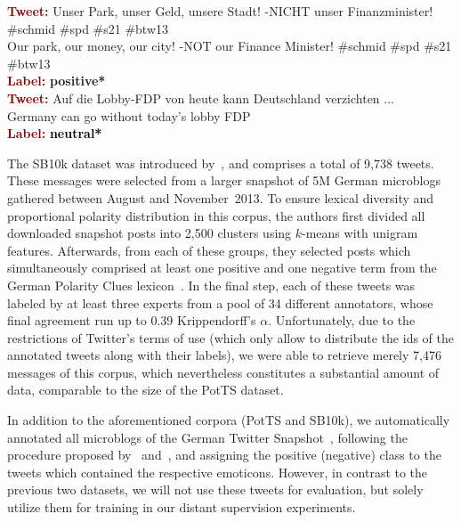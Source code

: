 \begin{example}\label{snt:cgsa:exmp:anno2}
  \noindent\textup{\bfseries\textcolor{darkred}{Tweet:}} {\upshape Unser Park, unser Geld, unsere Stadt! -NICHT unser Finanzminister! \smiley{} \#schmid \#spd \#s21 \#btw13}\\
  \noindent Our park, our money, our city! -NOT our Finance Minister! \smiley{} \#schmid \#spd \#s21 \#btw13\\
  \noindent\textup{\bfseries\textcolor{darkred}{Label:}}\hspace*{2em}\textbf{%
    \upshape\textcolor{green3}{positive*}}\\[1.5em]
  \noindent\textup{\bfseries\textcolor{darkred}{Tweet:}} {\upshape Auf die Lobby-FDP von heute kann Deutschland verzichten ...}\\
  \noindent Germany can go without today's lobby FDP\\
  \noindent\textup{\bfseries\textcolor{darkred}{Label:}}\hspace*{2em}\textbf{%
    \upshape\textcolor{black}{neutral*}}
\end{example}

The SB10k dataset was introduced by~\citet{Cieliebak:17}, and
comprises a total of 9,738 tweets.  These messages were selected from
a larger snapshot of 5M German microblogs gathered between August and
November~2013.  To ensure lexical diversity and proportional polarity
distribution in this corpus, the authors first divided all downloaded
snapshot posts into 2,500 clusters using $k$-means with unigram
features.  Afterwards, from each of these groups, they selected posts
which simultaneously comprised at least one positive and one negative
term from the German Polarity Clues lexicon~\cite{Waltinger:10}.  In
the final step, each of these tweets was labeled by at least three
experts from a pool of 34 different annotators, whose final agreement
run up to 0.39 Krippendorff's $\alpha$.  Unfortunately, due to the
restrictions of Twitter's terms of use (which only allow to distribute
the ids of the annotated tweets along with their labels), we were able
to retrieve merely 7,476 messages of this corpus, which nevertheless
constitutes a substantial amount of data, comparable to the size of
the PotTS dataset.

In addition to the aforementioned corpora (PotTS and SB10k), we
automatically annotated all microblogs of the German Twitter
Snapshot~\cite{Scheffler:14}, following the procedure proposed
by~\citet{Read:05} and~\citet{Go:09}, and assigning the positive
(negative) class to the tweets which contained the respective
emoticons.  However, in contrast to the previous two datasets, we will
not use these tweets for evaluation, but solely utilize them for
training in our distant supervision experiments.

